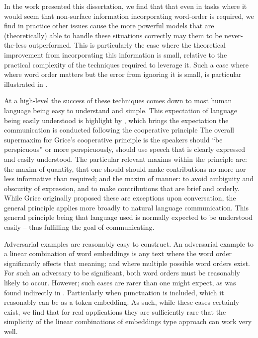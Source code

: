 \documentclass{book}
\begin{document}
In the work presented this dissertation, 
we find that that even in tasks where it would seem that non-surface information incorporating word-order is required,
we find in practice other issues cause the more powerful models that are (theoretically) able to handle these situations correctly may them to be never-the-less outperformed.
This is particularly the case where the theoretical improvement from incorporating this information is small, relative to the practical complexity of the techniques required to leverage it.
Such a case where where word order matters but the error from ignoring it is small, is particular illustrated in .

At a high-level the success of these techniques comes down to most human language being easy to understand and simple.
This expectation of language being easily understood is highlight by \citep{grice1975logic}, which brings the expectation the communication is conducted following the cooperative principle
The overall supermaxim for Grice's cooperative principle is the speakers should ``be perspicuous'' or more perspicuously, should use speech that is clearly expressed and easily understood.
The particular relevant maxims within the principle are:
the maxim of quantity, that one should should make contributions no more nor less informative than required;
and the maxim of manner: to avoid ambiguity and obscurity of expression, and to make contributions that are brief and orderly.
While Grice originally proposed these are exceptions upon conversation, the general principle applies more broadly to natural language communication.
This general principle being that language used is normally expected to be understood easily -- thus fulfilling the goal of communicating.


Adversarial examples are reasonably easy to construct.
An adversarial example to a linear combination of word embeddings is any text where the word order significantly effects that meaning;
and where multiple possible word orders exist.
For such an adversary to be significant, both word orders must be reasonably likely to occur.
However; such cases are rarer than one might expect, as was found indirectly in .
Particularly when punctuation is included, which it reasonably can be as a token embedding.
As such, while these cases certainly exist, we find that for real applications
they are sufficiently rare that the simplicity of the linear combinations of embeddings type approach can work very well.
\end{document}
